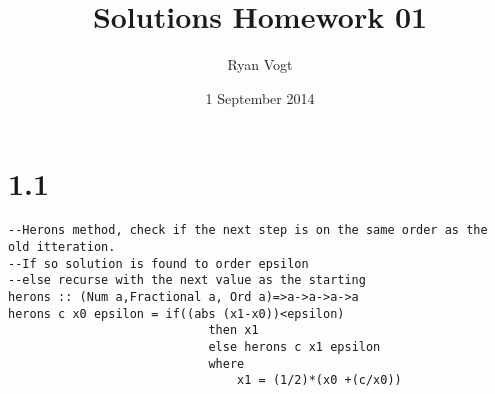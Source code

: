 \documentclass{sig-alternate}
\begin{document}
\title{Solutions Homework 01}
\author{
\alignauthor
Ryan Vogt
}
\date{1 September 2014}
\maketitle

\section{1.1}
\label{overview}

\begin{verbatim}
--Herons method, check if the next step is on the same order as the old itteration.
--If so solution is found to order epsilon
--else recurse with the next value as the starting
herons :: (Num a,Fractional a, Ord a)=>a->a->a->a
herons c x0 epsilon = if((abs (x1-x0))<epsilon)
							then x1
							else herons c x1 epsilon
							where 
								x1 = (1/2)*(x0 +(c/x0))
\end{verbatim}

\balance
\end{document}
